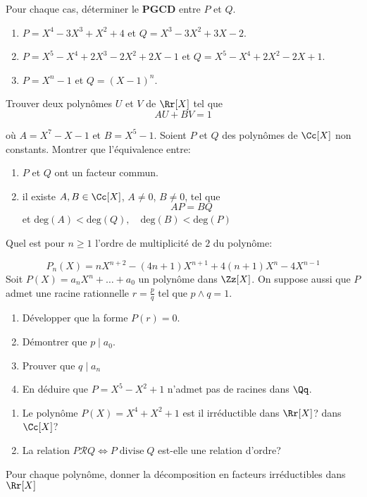 \documentclass[10pt, a4paper, twocolumn]{homework}
\begin{document}
Pour chaque cas, déterminer le \textbf{PGCD} entre $P$ et $Q$.

\begin{enumerate}
  \item $P=X^4-3X^3 + X^2 + 4$ et $Q=X^3-3X^2+3X-2$.
  \item $P=X^5-X^4+2X^3-2X^2+2X-1$ et $Q=X^5-X^4+2X^2-2X+1$.
  \item $P=X^n -1$ et $Q=(X-1)^n$.
\end{enumerate}
Trouver deux polynômes $U$ et $V$ de $\Rr[X]$ tel que 
$$
AU + BV = 1
$$

où $A = X^7-X-1$ et $B=X^5-1$.
Soient $P$ et $Q$ des polynômes de $\Cc[X]$ non constants. Montrer  que
l'équivalence entre:

\begin{enumerate}
  \item $P$ et $Q$ ont un facteur commun.
  \item il existe $A,B\in \Cc[X]$, $A\neq0$, $B\neq 0$, tel que
    $$
    AP = BQ
    $$
  et $\text{deg}(A)< \text{deg}(Q),\quad \text{deg}(B)<\text{deg}(P)$ 
\end{enumerate}
Quel est pour $n\geq 1$ l'ordre de multiplicité de $2$ du polynôme:

$$
P_n(X)= n X^{n+2}-(4n+1)X^{n+1}+4(n+1)X^n-4X^{n-1}
$$
Soit $P(X)=a_nX^n+\ldots+a_0$ un polynôme dans $\Zz[X]$. On suppose aussi
que $P$ admet une racine rationnelle $r=\frac{p}{q}$ tel que $p\wedge q
=1$.
\begin{enumerate}
  \item Développer que la forme $P(r)=0$.
  \item Démontrer que $p\;|\; a_0$.
  \item Prouver que $q\;|\; a_n$
  \item En déduire que $P=X^5 - X^2+1$ n'admet pas de racines dans
    $\Qq$.
\end{enumerate}

\begin{enumerate}
  \item Le polynôme $P(X) = X^4 + X^2 + 1$ est il irréductible  dans $\Rr[X]$?
dans $\Cc[X]$?
\item La relation $P\mathcal{R} Q \iff P\; \text{divise}\; Q$  est-elle une
    relation d'ordre?
\end{enumerate}
Pour chaque polynôme, donner la décomposition en facteurs irréductibles dans
$\Rr[X]$
\end{document}
